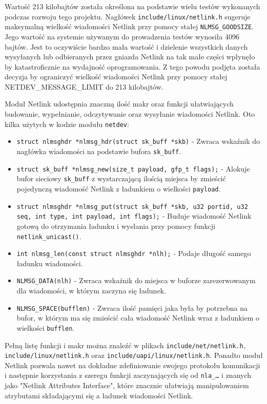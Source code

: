 \documentclass[10pt]{scrartcl}
\begin{document}
Wartość 213 kilobajtów została określona na podstawie wielu testów wykonanych podczas rozwoju tego projektu. Nagłówek \texttt{include/linux/netlink.h} sugeruje maksymalną wielkość wiadomości Netlink przy pomocy stałej \texttt{NLMSG\_GOODSIZE}. Jego wartość na systemie używanym do prowadzenia testów wynosiła 4096 bajtów. Jest to oczywiście bardzo mała wartość i dzielenie wszystkich danych wysyłanych lub odbieranych przez gniazda Netlink na tak małe części wpłynęło by katastroficznie na wydajność oprogramowania. Z tego powodu podjęta została decyzja by ograniczyć wielkość wiadomości Netlink przy pomocy stałej NETDEV\_MESSAGE\_LIMIT do 213 kilobajtów.

Moduł Netlink udostępnia znaczną ilość makr oraz funkcji ułatwiających budowanie, wypełnianie, odczytywanie oraz wysyłanie wiadomości Netlink.  Oto kilka użytych w kodzie modułu \texttt{netdev}:

\begin{itemize}
\itemsep1pt\parskip0pt
\item
  \texttt{struct nlmsghdr *nlmsg\_hdr(struct sk\_buff *skb)} - Zwraca wskaźnik do nagłówka wiadomości na podstawie bufora \texttt{sk\_buff}.
\item
  \texttt{struct sk\_buff *nlmsg\_new(size\_t payload, gfp\_t flags);} - Alokuje bufor sieciowy \texttt{sk\_buff} z wystarczającą ilością miejsca by zmieścić pojedynczą wiadomość Netlink z ładunkiem o wielkości \texttt{payload}.
\item
  \texttt{struct nlmsghdr *nlmsg\_put(struct sk\_buff *skb, u32 portid, u32 seq, int type, int payload, int flags);} - Buduje wiadomość Netlink gotową do otrzymania ładunku i wysłania przy pomocy funkcji \texttt{netlink\_unicast()}.
\item
  \texttt{int nlmsg\_len(const struct nlmsghdr *nlh);} - Podaje długość samego ładunku wiadomości.
\item
  \texttt{NLMSG\_DATA(nlh)} - Zwraca wskaźnik do miejsca w buforze zarezerwowanym dla wiadomości, w którym zaczyna się ładunek.
\item
  \texttt{NLMSG\_SPACE(bufflen)} - Zwraca ilość pamięci jaka była by potrzebna na bufor, w którym ma się zmieścić cała wiadomość Netlink wraz z ładunkiem o wielkości \texttt{bufflen}.
\end{itemize}

Pełną listę funkcji i makr można znaleźć w plikach \texttt{include/net/netlink.h}, \texttt{include/linux/netlink.h} oraz \texttt{include/uapi/linux/netlink.h}. Ponadto moduł Netlink pozwala nawet na dokładne zdefiniowanie swojego protokołu komunikacji i następnie korzystania z szeregu funkcji zaczynających się od \texttt{nla\_\ldots} i znanych jako "Netlink Attributes Interface", które znacznie ułatwiają manipulowaniem atrybutami składającymi się a ładunek wiadomości Netlink.
\end{document}
